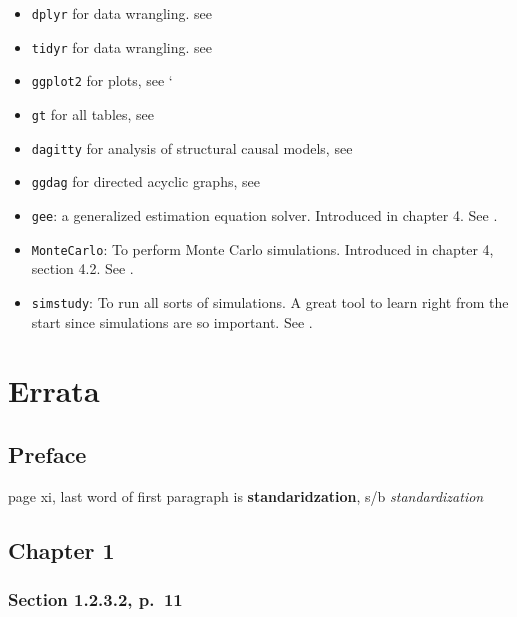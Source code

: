 \documentclass[
]{book}
\providecommand{\tightlist}{%
  \setlength{\itemsep}{0pt}\setlength{\parskip}{0pt}}
\theoremstyle{definition}
\theoremstyle{definition}
\theoremstyle{definition}
\theoremstyle{definition}
\theoremstyle{remark}
\begin{document}
\begin{itemize}
\tightlist
\item
  \texttt{dplyr} for data wrangling. see \citet{R-dplyr}
\item
  \texttt{tidyr} for data wrangling. see \citet{R-tidyr}
\item
  \texttt{ggplot2} for plots, see \citet{R-ggplot2}`
\item
  \texttt{gt} for all tables, see \citet{R-gt}
\item
  \texttt{dagitty} for analysis of structural causal models, see \citet{R-dagitty}
\item
  \texttt{ggdag} for directed acyclic graphs, see \citet{R-ggdag}
\item
  \texttt{gee}: a generalized estimation equation solver. Introduced in chapter 4.
  See \citet{R-gee}.
\item
  \texttt{MonteCarlo}: To perform Monte Carlo simulations. Introduced in chapter 4,
  section 4.2. See \citet{R-MonteCarlo}.
\item
  \texttt{simstudy}: To run all sorts of simulations. A great tool to learn right from the
  start since simulations are so important. See \citet{R-simstudy}.
\end{itemize}

\hypertarget{errata}{%
\chapter*{Errata}\label{errata}}

\hypertarget{preface}{%
\section*{Preface}\label{preface}}

page xi, last word of first paragraph is \textbf{standaridzation},
s/b \emph{standardization}

\hypertarget{chapter-1}{%
\section*{Chapter 1}\label{chapter-1}}

\hypertarget{section-1.2.3.2-p.-11}{%
\subsection*{Section 1.2.3.2, p.~11}\label{section-1.2.3.2-p.-11}}
\end{document}

